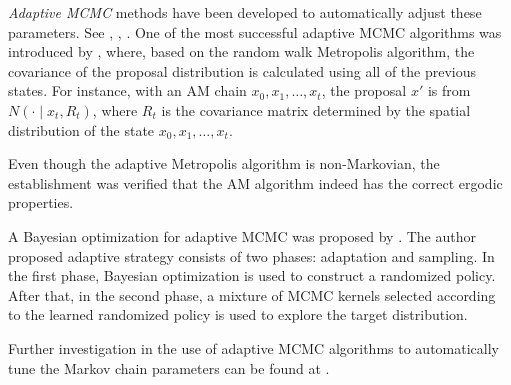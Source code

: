 
\textit{Adaptive MCMC} methods have been developed to automatically adjust these parameters. See \eg \cite{andrieu2008tutorial}, \cite{atchade2009adaptive}, \cite{roberts2009examples}. One of the most successful adaptive MCMC algorithms was introduced by \cite{haario2001adaptive}, where, based on the  random walk Metropolis algorithm, the covariance of the proposal distribution is calculated using all of the previous states. For instance, with an AM chain $x_0,x_1,\ldots,x_t$, the proposal $x'$ is from $N(\cdot\mid x_t,R_t)$, where $R_t$ is the covariance matrix determined by the spatial distribution of the state $x_0,x_1,\ldots,x_t$. 

Even though the adaptive Metropolis algorithm is non-Markovian, the establishment was verified that the AM algorithm indeed has the correct ergodic properties. 

A Bayesian optimization for adaptive MCMC was proposed by \cite{mahendran2012adaptive}. The author proposed adaptive strategy consists of two phases: adaptation and sampling. In the first phase, Bayesian optimization is used to construct a randomized policy. After that, in the second phase,  a mixture of MCMC kernels selected according to the learned randomized policy is used to explore the target distribution. 

Further investigation in the use of adaptive MCMC algorithms to automatically
tune the Markov chain parameters can be found at \cite{roberts2009examples}. 


